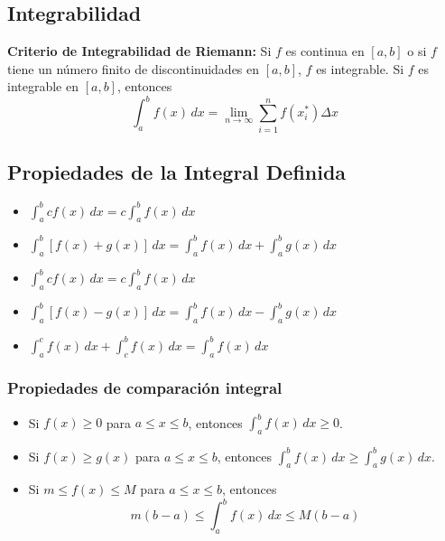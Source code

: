 \documentclass[a4paper,12pt]{article}
\theoremstyle{definition}
\begin{document}
\subsection{Integrabilidad}
\textbf{Criterio de Integrabilidad de Riemann:} Si $f$ es continua en $[a,b]$ o si $f$ tiene un número finito de discontinuidades en $[a,b]$, $f$ es integrable.
\newline Si $f$ es integrable en $[a,b]$, entonces 
\[ \int_{a}^{b} f(x) \, dx = \lim_{n \to \infty} \sum_{i=1}^{n} f(x_i^*) \Delta x \] 

\subsection{Propiedades de la Integral Definida}
\begin{tcolorbox}[title=Propiedades de la Integral Definida]
    \begin{itemize}
        \item $\int_{a}^{b} c f(x) \, dx = c \int_{a}^{b} f(x) \, dx$
        \item $\int_{a}^{b} [f(x) + g(x)] \, dx = \int_{a}^{b} f(x) \, dx + \int_{a}^{b} g(x) \, dx$
        \item $\int_{a}^{b} c f(x) \, dx = c \int_{a}^{b} f(x) \, dx$
        \item $\int_{a}^{b} [f(x) - g(x)] \, dx = \int_{a}^{b} f(x) \, dx - \int_{a}^{b} g(x) \, dx$
        \item $\int_{a}^{c} f(x) \, dx + \int_{c}^{b} f(x) \, dx = \int_{a}^{b} f(x) \, dx$
    \end{itemize}
\end{tcolorbox}

\subsubsection{Propiedades de comparación integral}
\begin{itemize}
    \item Si $f(x) \geqslant 0$ para $a \leqslant x \leqslant b$, entonces $\int_{a}^{b} f(x) \, dx \geqslant 0$.
    \item Si $f(x) \geqslant g(x)$ para $a \leqslant x \leqslant b$, entonces $\int_{a}^{b} f(x) \, dx \geqslant \int_{a}^{b} g(x) \, dx$.
    \item Si $m \leqslant f(x) \leqslant M$ para $a \leqslant x \leqslant b$, entonces \[ m(b-a) \leqslant \int_{a}^{b} f(x) \, dx \leqslant M(b-a) \]
\end{itemize}
\end{document}
